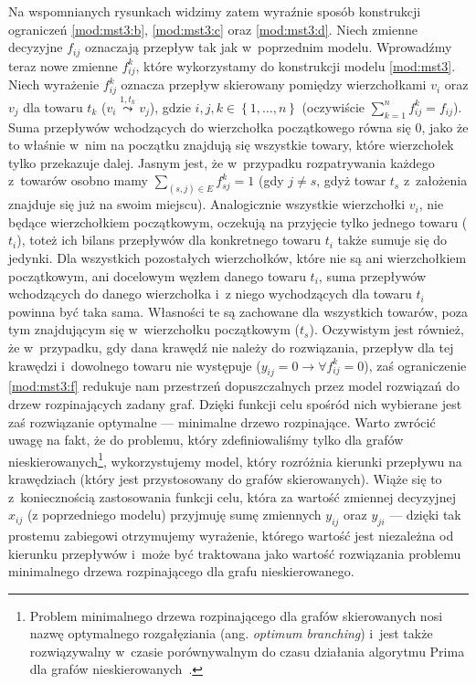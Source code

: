 Na wspomnianych rysunkach widzimy zatem wyraźnie sposób konstrukcji ograniczeń \ref{mod:mst3:b}, \ref{mod:mst3:c} oraz \ref{mod:mst3:d}.
Niech zmienne decyzyjne $f_{ij}$ oznaczają przepływ tak jak w~poprzednim modelu.
Wprowadźmy teraz nowe zmienne $f^{k}_{ij}$, które wykorzystamy do konstrukcji modelu \ref{mod:mst3}.
Niech wyrażenie $f^{k}_{ij}$ oznacza przepływ skierowany pomiędzy wierzchołkami $v_{i}$ oraz $v_{j}$ dla towaru $t_{k}$ ($v_{i} \overset{1, t_{k}}{\leadsto} v_{j}$), gdzie $i, j, k \in \left\{ 1, \dots, n \right\}$ (oczywiście $\sum_{k=1}^{n} f^{k}_{ij} = f_{ij}$).
Suma przepływów wchodzących do wierzchołka początkowego równa się $0$, jako że to właśnie w~nim na początku znajdują się wszystkie towary, które wierzchołek tylko przekazuje dalej.
Jasnym jest, że w~przypadku rozpatrywania każdego z~towarów osobno mamy $\sum_{\left( s, j \right ) \in E} f^{k}_{sj} = 1$ (gdy $j \neq s$, gdyż towar $t_{s}$ z~założenia znajduje się już na swoim miejscu).
Analogicznie wszystkie wierzchołki $v_{i}$, nie będące wierzchołkiem początkowym, oczekują na przyjęcie tylko jednego towaru ($t_{i}$), toteż ich bilans przepływów dla konkretnego towaru $t_{i}$ także sumuje się do jedynki.
Dla wszystkich pozostałych wierzchołków, które nie są ani wierzchołkiem początkowym, ani docelowym węzłem danego towaru $t_{i}$, suma przepływów wchodzących do danego wierzchołka i~z niego wychodzących dla towaru $t_{i}$ powinna być taka sama.
Własności te są zachowane dla wszystkich towarów, poza tym znajdującym się w~wierzchołku początkowym ($t_{s}$).
Oczywistym jest również, że w~przypadku, gdy dana krawędź nie należy do rozwiązania, przepływ dla tej krawędzi i~dowolnego towaru nie występuje ($y_{ij} = 0 \rightarrow \forall f_{ij}^{k} = 0$), zaś ograniczenie \ref{mod:mst3:f} redukuje nam przestrzeń dopuszczalnych przez model rozwiązań do drzew rozpinających zadany graf.
Dzięki funkcji celu spośród nich wybierane jest zaś rozwiązanie optymalne --- minimalne drzewo rozpinające.
Warto zwrócić uwagę na fakt, że do problemu, który zdefiniowaliśmy tylko dla grafów nieskierowanych\footnote{
	Problem minimalnego drzewa rozpinającego dla grafów skierowanych nosi nazwę optymalnego rozgałęziania (ang. \textit{optimum branching}) i~jest także rozwiązywalny w~czasie porównywalnym do czasu działania algorytmu Prima dla grafów nieskierowanych~\cite{NET:NET3230070103}.
}, wykorzystujemy model, który rozróżnia kierunki przepływu na krawędziach (który jest przystosowany do grafów skierowanych).
Wiąże się to z~koniecznością zastosowania funkcji celu, która za wartość zmiennej decyzyjnej $x_{ij}$ (z poprzedniego modelu) przyjmuję sumę zmiennych $y_{ij}$ oraz $y_{ji}$ --- dzięki tak prostemu zabiegowi otrzymujemy wyrażenie, którego wartość jest niezależna od kierunku przepływów i~może być traktowana jako wartość rozwiązania problemu minimalnego drzewa rozpinającego dla grafu nieskierowanego.




